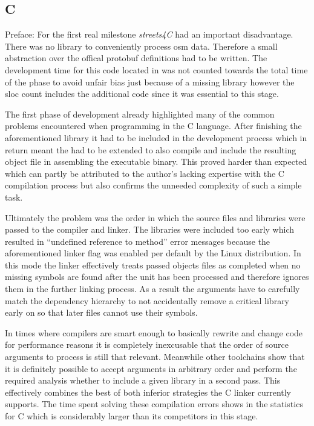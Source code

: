 \subsection{C}
\label{subsec:Implementation::Counting::C}

Preface: For the first real milestone \textit{streets4C} had an important disadvantage. There was no library to conveniently process \gls{osm} data. Therefore a small abstraction over the offical \gls{protobuf} definitions had to be written. The development time for this code located in  was not counted towards the total time of the phase to avoid unfair bias just because of a missing library however the \gls{sloc} count includes the additional code since it was essential to this stage.

The first phase of development already highlighted many of the common problems encountered when programming in the C language. After finishing the aforementioned library it had to be included in the development process which in return meant the  had to be extended to also compile  and include the resulting object file in assembling the executable binary. This proved harder than expected which can partly be attributed to the author's lacking expertise with the C compilation process but also confirms the unneeded complexity of such a simple task.

Ultimately the problem was the order in which the source files and libraries were passed to the compiler and linker. The libraries were included too early which resulted in ``undefined reference to method'' error messages because the aforementioned linker flag  was enabled per default by the Linux distribution. In this mode the linker effectively treats passed objects files as completed when no missing symbols are found after the unit has been processed and therefore ignores them in the further linking process. As a result the arguments have to carefully match the dependency hierarchy to not accidentally remove a critical library early on so that later files cannot use their symbols.

In times where compilers are smart enough to basically rewrite and change code for performance reasons it is completely inexcusable that the order of source arguments to process is still that relevant. Meanwhile other toolchains show that it is definitely possible to accept arguments in arbitrary order and perform the required analysis whether to include a given library in a second pass. This effectively combines the best of both inferior strategies the C linker currently supports. The time spent solving these compilation errors shows in the statistics for C which is considerably larger than its competitors in this stage.

